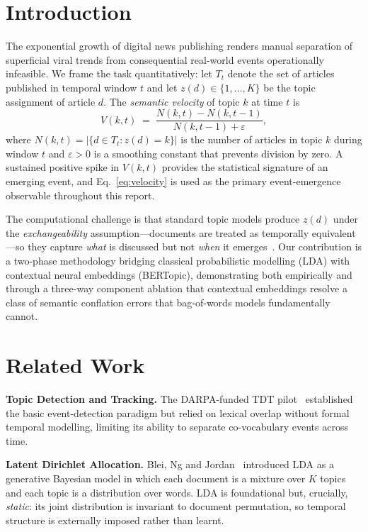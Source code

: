 \documentclass[10pt,twocolumn,a4paper]{article}
\begin{document}
\section{Introduction}
\label{sec:intro}

The exponential growth of digital news publishing renders manual separation of superficial viral trends from consequential real-world events operationally infeasible. We frame the task quantitatively: let $T_t$ denote the set of articles published in temporal window $t$ and let $z(d) \in \{1,\dots,K\}$ be the topic assignment of article $d$. The \emph{semantic velocity} of topic $k$ at time $t$ is
\begin{equation}
\label{eq:velocity}
V(k, t) \;=\; \frac{N(k,t) - N(k,t{-}1)}{N(k,t{-}1) + \varepsilon},
\end{equation}
where $N(k,t) = |\{d \in T_t : z(d) = k\}|$ is the number of articles in topic $k$ during window $t$ and $\varepsilon > 0$ is a smoothing constant that prevents division by zero. A sustained positive spike in $V(k,t)$ provides the statistical signature of an emerging event, and Eq.~\eqref{eq:velocity} is used as the primary event-emergence observable throughout this report.

The computational challenge is that standard topic models produce $z(d)$ under the \emph{exchangeability} assumption---documents are treated as temporally equivalent---so they capture \emph{what} is discussed but not \emph{when} it emerges~\cite{allan1998,blei2003}. Our contribution is a two-phase methodology bridging classical probabilistic modelling (LDA) with contextual neural embeddings (BERTopic), demonstrating both empirically and through a three-way component ablation that contextual embeddings resolve a class of semantic conflation errors that bag-of-words models fundamentally cannot.

\section{Related Work}
\label{sec:related}

\textbf{Topic Detection and Tracking.} The DARPA-funded TDT pilot~\cite{allan1998} established the basic event-detection paradigm but relied on lexical overlap without formal temporal modelling, limiting its ability to separate co-vocabulary events across time.

\textbf{Latent Dirichlet Allocation.} Blei, Ng and Jordan~\cite{blei2003} introduced LDA as a generative Bayesian model in which each document is a mixture over $K$ topics and each topic is a distribution over words. LDA is foundational but, crucially, \emph{static}: its joint distribution is invariant to document permutation, so temporal structure is externally imposed rather than learnt.
\end{document}
